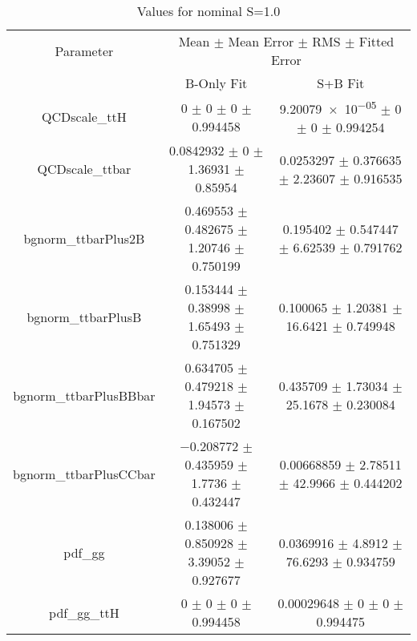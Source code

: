 \begin{table}
\centering
\caption{Values for nominal S=1.0}
\begin{tabular}{ccc}
\toprule
Parameter & \multicolumn{2}{c}{Mean $\pm$ Mean Error $\pm$ RMS $\pm$ Fitted Error}\\
 & B-Only Fit & S+B Fit\\
\midrule
QCDscale\_ttH & \num{0} $\pm$ \num{0} $\pm$ \num{0} $\pm$ \num{0.994458} & \num{9.20079e-05} $\pm$ \num{0} $\pm$ \num{0} $\pm$ \num{0.994254}\\
QCDscale\_ttbar & \num{0.0842932} $\pm$ \num{0} $\pm$ \num{1.36931} $\pm$ \num{0.85954} & \num{0.0253297} $\pm$ \num{0.376635} $\pm$ \num{2.23607} $\pm$ \num{0.916535}\\
bgnorm\_ttbarPlus2B & \num{0.469553} $\pm$ \num{0.482675} $\pm$ \num{1.20746} $\pm$ \num{0.750199} & \num{0.195402} $\pm$ \num{0.547447} $\pm$ \num{6.62539} $\pm$ \num{0.791762}\\
bgnorm\_ttbarPlusB & \num{0.153444} $\pm$ \num{0.38998} $\pm$ \num{1.65493} $\pm$ \num{0.751329} & \num{0.100065} $\pm$ \num{1.20381} $\pm$ \num{16.6421} $\pm$ \num{0.749948}\\
bgnorm\_ttbarPlusBBbar & \num{0.634705} $\pm$ \num{0.479218} $\pm$ \num{1.94573} $\pm$ \num{0.167502} & \num{0.435709} $\pm$ \num{1.73034} $\pm$ \num{25.1678} $\pm$ \num{0.230084}\\
bgnorm\_ttbarPlusCCbar & \num{-0.208772} $\pm$ \num{0.435959} $\pm$ \num{1.7736} $\pm$ \num{0.432447} & \num{0.00668859} $\pm$ \num{2.78511} $\pm$ \num{42.9966} $\pm$ \num{0.444202}\\
pdf\_gg & \num{0.138006} $\pm$ \num{0.850928} $\pm$ \num{3.39052} $\pm$ \num{0.927677} & \num{0.0369916} $\pm$ \num{4.8912} $\pm$ \num{76.6293} $\pm$ \num{0.934759}\\
pdf\_gg\_ttH & \num{0} $\pm$ \num{0} $\pm$ \num{0} $\pm$ \num{0.994458} & \num{0.00029648} $\pm$ \num{0} $\pm$ \num{0} $\pm$ \num{0.994475}\\
\bottomrule
\end{tabular}
\end{table}